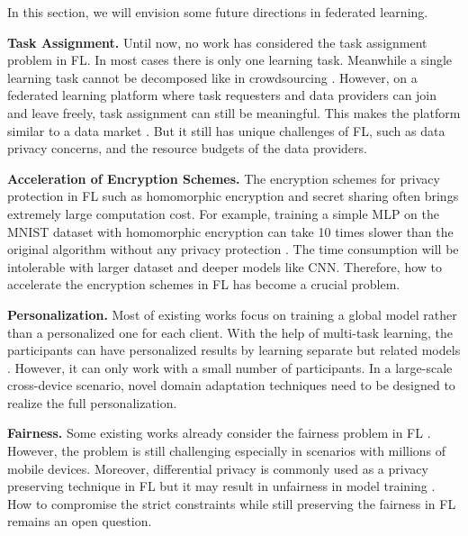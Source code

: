 \documentclass[11pt]{article}
\newcommand{\fakeparagraph}[1]{\vspace{1mm}\noindent\textbf{#1.}}
\begin{document}
In this section, we will envision some future directions in federated learning.

\fakeparagraph{Task Assignment}
Until now, no work has considered the task assignment problem in FL. 
In most cases there is only one learning task. 
Meanwhile a single learning task cannot be decomposed like in crowdsourcing \cite{DBLP:journals/tkde/TongCZJSL18}.
However, on a federated learning platform where task requesters and data providers can join and leave freely, task assignment can still be meaningful.
This makes the platform similar to a data market \cite{DBLP:journals/pvldb/FernandezSF20}.
But it still has unique challenges of FL, such as data privacy concerns, and the resource budgets of the data providers.

\fakeparagraph{Acceleration of Encryption Schemes}
The encryption schemes for privacy protection in FL such as homomorphic encryption and secret sharing often brings extremely large computation cost. 
For example, training a simple MLP on the MNIST dataset with homomorphic encryption can take 10 times slower than the original algorithm without any privacy protection \cite{DBLP:journals/tifs/PhongAHWM18}.
The time consumption will be intolerable with larger dataset and deeper models like CNN.
Therefore, how to accelerate the encryption schemes in FL has become a crucial problem.

\fakeparagraph{Personalization}
Most of existing works focus on training a global model rather than a personalized one for each client. 
With the help of multi-task learning, the participants can have personalized results by learning separate but related models \cite{DBLP:conf/nips/SmithCST17}. 
However, it can only work with a small number of participants. 
In a large-scale cross-device scenario, novel domain adaptation techniques need to be designed to realize the full personalization.

\fakeparagraph{Fairness}
Some existing works already consider the fairness problem in FL \cite{DBLP:conf/icml/MohriSS19, DBLP:conf/iclr/LiSBS20}. 
However, the problem is still challenging especially in scenarios with millions of mobile devices.
Moreover, differential privacy is commonly used as a privacy preserving technique in FL but it may result in unfairness in model training \cite{DBLP:conf/nips/BagdasaryanPS19}.
How to compromise the strict constraints while still preserving the fairness in FL remains an open question.
\end{document}
